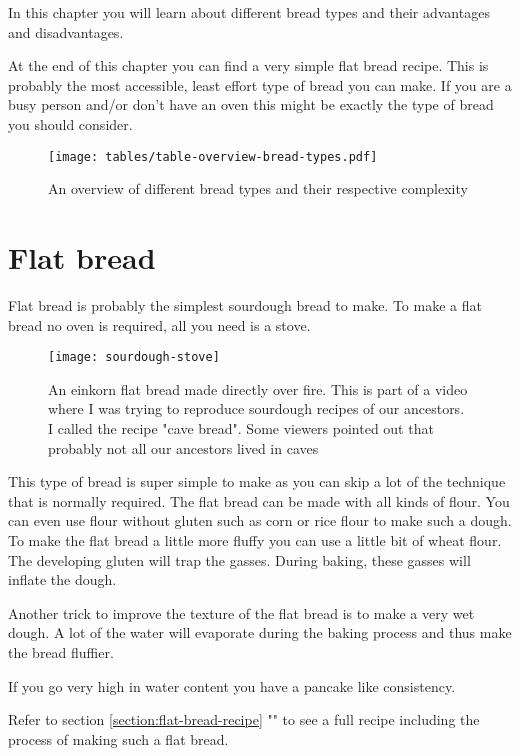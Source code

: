 In this chapter you will learn about different bread types
and their advantages and disadvantages.

At the end of this chapter
you can find a very simple flat bread recipe. This is probably
the most accessible, least effort type of bread you can make.
If you are a busy person and/or don't have an oven this might
be exactly the type of bread you should consider.

\begin{figure}[!htb]
  \texttt{[image: tables/table-overview-bread-types.pdf]}
  \caption{An overview of different bread types and their respective complexity}
  \label{tab:bread-types-comparison}
\end{figure}

\section{Flat bread}

Flat bread is probably the simplest sourdough bread to make.
To make a flat bread no oven is required, all you need is a stove.

\begin{figure}[!htb]
  \texttt{[image: sourdough-stove]}
  \caption{An einkorn flat bread made directly over fire. This
  is part of a video where I was trying to reproduce sourdough
  recipes of our ancestors. I called the recipe "cave bread". Some viewers
  pointed out that probably not all our ancestors lived in caves
  }
\end{figure}

This type of bread is super simple to make as you can skip
a lot of the technique that is normally required. The flat
bread can be made with all kinds of flour. You can even use
flour without gluten such as corn or rice flour to make such
a dough. To make the flat bread a little more fluffy you
can use a little bit of wheat flour. The developing gluten
will trap the gasses. During baking, these gasses will
inflate the dough.

Another trick to improve the texture of the flat bread is to
make a very wet dough. A lot of the water will evaporate
during the baking process and thus make the bread fluffier.

If you go very high in water content you have a pancake
like consistency.

Refer to section \ref{section:flat-bread-recipe} ""
to see a full recipe including the process of making such a flat bread.

